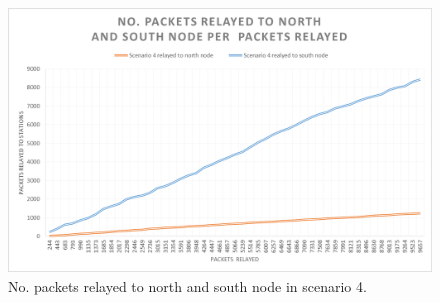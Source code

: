 \begin{figure}[H]
	\centering
	\includegraphics[width=0.8\linewidth]{results/NoPacketsRelayedScenario4}
	\caption{No. packets relayed to north and south node in scenario 4.}
	\label{fig:nopacketsrelayedscenario4}
\end{figure}

